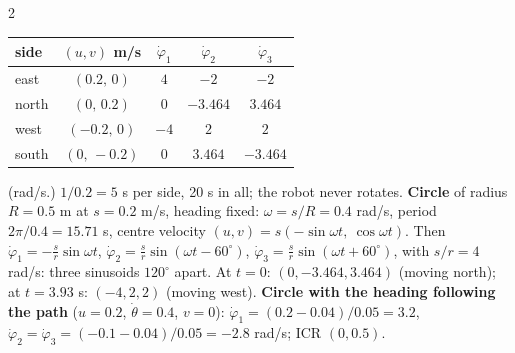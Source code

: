 \begin{multicols}{2}
\begin{recipe}[omni robot following a path without rotating ($\dot\theta=0$, $\theta=0$)]
\begin{enumerate}
\end{enumerate}
\end{recipe}
\begin{worked}
\begin{center}\small\begin{tabular}{@{}lcccc@{}}\toprule
side & $(u,v)$ m/s & $\dot\varphi_1$ & $\dot\varphi_2$ & $\dot\varphi_3$\\\midrule
east & $(0.2,\,0)$ & $4$ & $-2$ & $-2$\\
north & $(0,\,0.2)$ & $0$ & $-3.464$ & $3.464$\\
west & $(-0.2,\,0)$ & $-4$ & $2$ & $2$\\
south & $(0,\,-0.2)$ & $0$ & $3.464$ & $-3.464$\\\bottomrule\end{tabular}\end{center}
(rad/s.) $1/0.2=5$ s per side, 20 s in all; the robot never rotates. \textbf{Circle} of radius $R=0.5$ m at $s=0.2$ m/s, heading fixed: $\omega=s/R=0.4$ rad/s, period $2\pi/0.4=15.71$ s, centre velocity $(u,v)=s(-\sin\omega t,\ \cos\omega t)$. Then
$\dot\varphi_1=-\tfrac sr\sin\omega t$, $\dot\varphi_2=\tfrac sr\sin(\omega t-60^\circ)$, $\dot\varphi_3=\tfrac sr\sin(\omega t+60^\circ)$, with $s/r=4$ rad/s: three sinusoids $120^\circ$ apart. At $t=0$: $(0,-3.464,3.464)$ (moving north); at $t=3.93$ s: $(-4,2,2)$ (moving west).
\textbf{Circle with the heading following the path} ($u=0.2$, $\dot\theta=0.4$, $v=0$): $\dot\varphi_1=(0.2-0.04)/0.05=3.2$, $\dot\varphi_2=\dot\varphi_3=(-0.1-0.04)/0.05=-2.8$ rad/s; ICR $(0,0.5)$.
\end{worked}


\end{multicols}
